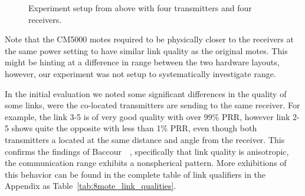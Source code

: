\begin{figure}[H]
	\centering
	\caption{Experiment setup from above with four transmitters and four receivers.}
	\label{fig:8mote_experiment_setup}
\end{figure}

Note that the CM5000 motes required to be physically closer to the receivers at the same power setting to have similar link quality as the original motes.
This might be hinting at a difference in range between the two hardware layouts, however, our experiment was not setup to systematically investigate range.

In the initial evaluation we noted some significant differences in the quality of some links, were the co-located transmitters are sending to the same receiver.
For example, the link 3-5 is of very good quality with over 99\% PRR, however link 2-5 shows quite the opposite with less than 1\% PRR, even though both transmitters a located at the same distance and angle from the receiver.
This confirms the findings of Baccour~\etal~\cite{Baccour2012}, specifically that link quality is anisotropic, \ie the communication range exhibits a nonspherical pattern.
More exhibitions of this behavior can be found in the complete table of link qualifiers in the Appendix as Table~\ref{tab:8mote_link_qualities}.

